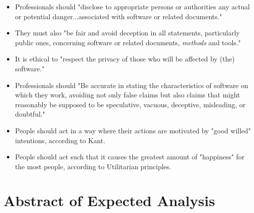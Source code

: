 \documentclass[11pt]{article}
\begin{document}
\begin{itemize}
\item Professionals should "disclose to appropriate persons or authorities any actual or potential danger...associated with software or related documents." \cite{secode}
\item They must also "be fair and avoid deception in all statements, particularly public ones, concerning software or related documents, \emph{methods} and tools." \cite{secode}
\item It is ethical to "respect the privacy of those who will be affected by (the) software." \cite{secode}
\item Professionals should "Be accurate in stating the characteristics of software on which they work, avoiding not only false claims but also claims that might reasonably be supposed to be speculative, vacuous, deceptive, misleading, or doubtful." \cite{secode}
\item People should act in a way where their actions are motivated by "good willed" intentions, according to Kant. \cite{kant}
\item People should act such that it causes the greatest amount of "happiness" for the most people, according to Utilitarian principles. \cite{util}
\end{itemize}

\section{Abstract of Expected Analysis}




\nocite{texTemp}
\nocite{BibTex}
\nocite{BibMang}
\nocite{bibStyle}


\end{document}

